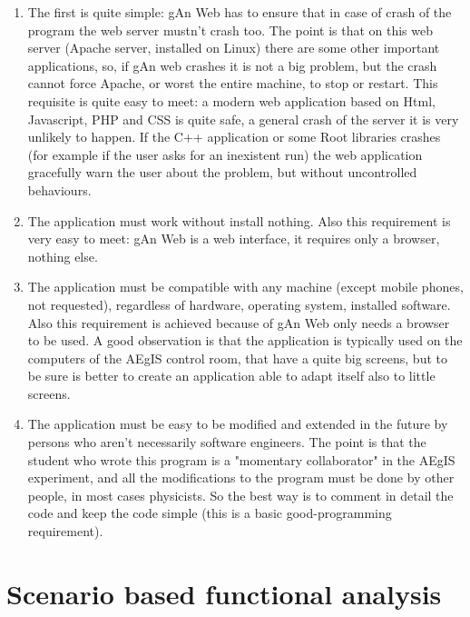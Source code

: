 \begin{enumerate}

\item The first is quite simple: gAn Web has to ensure that in case of crash of the program the web server mustn't crash too. The point is that on this web server (Apache server, installed on Linux) there are some other important applications, so, if gAn web crashes it is not a big problem, but the crash cannot force Apache, or worst the entire machine, to stop or restart. 
This requisite is quite easy to meet: a modern web application based on Html, Javascript, PHP and CSS is quite safe, a general crash of the server it is very unlikely to happen. If the C++ application or some Root libraries crashes (for example if the user asks for an inexistent run) the web application gracefully warn the user about the problem, but without uncontrolled behaviours.  

\item The application must work without install nothing. Also this requirement is very easy to meet: gAn Web is a web interface, it requires only a browser, nothing else.

\item The application must be compatible with any machine (except mobile phones, not requested), regardless of hardware, operating system, installed software. Also this requirement is achieved because of gAn Web only needs a browser to be used. A good observation is that the application is typically used on the computers of the AEgIS control room, that have a quite big screens, but to be sure is better to create an application able to adapt itself also to little screens.  

\item The application must be easy to be modified and extended in the future by persons who aren't necessarily software engineers. The point is that the student who wrote this program is a "momentary collaborator" in the AEgIS experiment, and all the modifications to the program must be done by other people, in most cases physicists. So the best way is to comment in detail the code and keep the code simple (this is a basic good-programming requirement).   


\end{enumerate}

\section{Scenario based functional analysis}


